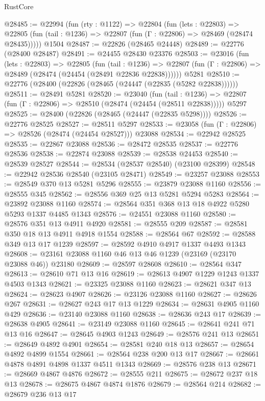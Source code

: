\begin{lexlean}{RustCore}
\begin{coremodule}
@28485 := @22994
    (fun (rty : @1122) =>
    @22804
      (fun (lets : @22803) =>
      @22805 (fun (tail : @1236) => @22807 (fun (Γ : @22806) => @28469 (@28474 @28435)))))
    @1504
@28487 := @22826 (@28465 @24448)
@28489 := @22776 (@28400 @28487)
@28491 := @24455 @28430 @23376
@28503 := @23016
    (fun (lets : @22803) =>
    @22805
      (fun (tail : @1236) =>
      @22807 (fun (Γ : @22806) => @28489 (@28474 (@24454 (@28491 @22836 @22838))))))
    @5281
@28510 := @22776 (@28400 (@22826 (@28465 (@24447 (@22835 (@5282 @22838))))))
@28511 := @28491 @5281
@28520 := @23040
    (fun (tail : @1236) => @22807 (fun (Γ : @22806) => @28510 (@28474 (@24454 (@28511 @22838)))))
    @5297
@28525 := @28400 (@22826 (@28465 (@24447 (@22835 @5298))))
@28526 := @22776 @28525
@28527 := @28511 @5297
@28533 := @23058 (fun (Γ : @22806) => @28526 (@28474 (@24454 @28527))) @23088
@28534 := @22942 @28525
@28535 := @22867 @23088
@28536 := @28472 @28535
@28537 := @22776 @28536
@28538 := @22874 @23088
@28539 := @28538 @24453
@28540 := @28539 @28527
@28544 := @28534 (@28537 @28540) (@23100 @28399)
@28548 := @22942 @28536 @28540 (@23105 @28471)
@28549 := @23257 @23088
@28553 := @28549 @370 @13 @5281 @5296
@28555 := @23879 @23088 @1160
@28556 := @28555 @345
@28562 := @28556 @369 @25 @13 @5281 @5294 @5283
@28564 := @23892 @23088 @1160
@28574 := @28564 @351 @368 @13 @18 @4922 @5280 @5293 @1337 @4485 @1343
@28576 := @24551 @23088 @1160
@28580 := @28576 @351 @13 @4911 @4920
@28581 := @28555 @209
@28587 := @28581 @350 @18 @13 @4911 @4918 @1554
@28588 := @28564 @67
@28592 := @28588 @349 @13 @17 @1239
@28597 := @28592 @4910 @4917 @1337 @4493 @1343
@28608 := @23161 @23088 @1160 @46 @13 @46 @1239 (@23169 (@23170 @23088 @46)) @23180
@28609 := @28597 @28608
@28610 := @28564 @347
@28613 := @28610 @71 @13 @16
@28619 := @28613 @4907 @1229 @1243 @1337 @4503 @1343
@28621 := @23325 @23088 @1160
@28623 := @28621 @347 @13
@28624 := @28623 @4907
@28626 := @23126 @23088 @1160
@28627 := @28626 @267
@28631 := @28627 @243 @17 @13 @1229
@28634 := @28631 @4905 @1160 @429
@28636 := @23140 @23088 @1160
@28638 := @28636 @243 @17
@28639 := @28638 @4905
@28641 := @23149 @23088 @1160
@28645 := @28641 @241 @71 @13 @16
@28647 := @28645 @4903 @1243
@28649 := @28576 @241 @13
@28651 := @28649 @4892 @4901
@28654 := @28581 @240 @18 @13
@28657 := @28654 @4892 @4899 @1554
@28661 := @28564 @238 @200 @13 @17
@28667 := @28661 @4878 @4891 @4898 @1337 @4511 @1343
@28669 := @28576 @238 @13
@28671 := @28669 @4867 @4876
@28672 := @28555 @211
@28675 := @28672 @237 @18 @13
@28678 := @28675 @4867 @4874 @1876
@28679 := @28564 @214
@28682 := @28679 @236 @13 @17

\end{coremodule}
\end{lexlean}
